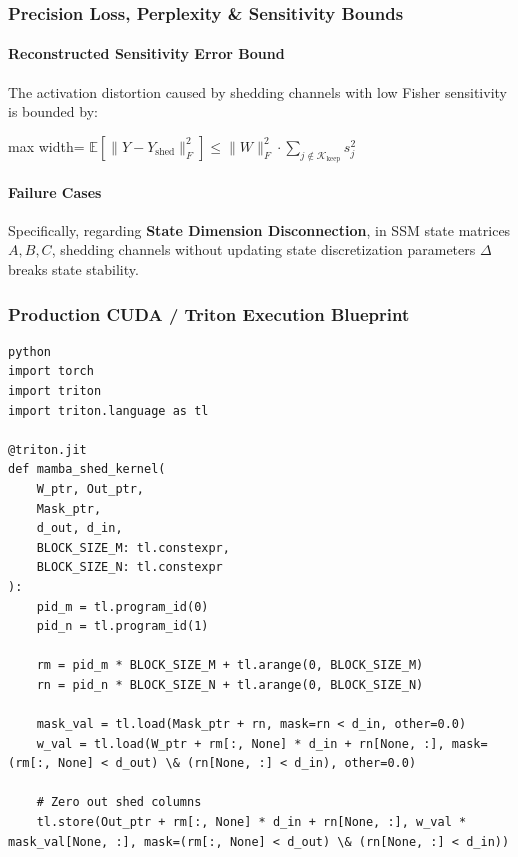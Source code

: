 \subsubsection*{Precision Loss, Perplexity \& Sensitivity Bounds}

\paragraph{Reconstructed Sensitivity Error Bound}

The activation distortion caused by shedding channels with low Fisher sensitivity is bounded by:

\begin{center}
\begin{adjustbox}{max width=\columnwidth}
$\displaystyle
\mathbb{E}\left[ \| Y - Y_{\text{shed}} \|_F^2 \right] \le \| W \|_F^2 \cdot \sum_{j \notin \mathcal{K}_{\text{keep}}} s_j^2
$
\end{adjustbox}
\end{center}

\paragraph{Failure Cases}

Specifically, regarding \textbf{State Dimension Disconnection}, in SSM state matrices $A, B, C$, shedding channels without updating state discretization parameters $\Delta$ breaks state stability.



\subsubsection*{Production CUDA / Triton Execution Blueprint}

\vspace{0.5em}
\begin{mdframed}[backgroundcolor=codebg, linecolor=codeframe, linewidth=1pt, roundcorner=4pt, innerleftmargin=2pt, innerrightmargin=5pt, innertopmargin=5pt, innerbottommargin=5pt]
\begin{lstlisting}
python
import torch
import triton
import triton.language as tl

@triton.jit
def mamba_shed_kernel(
    W_ptr, Out_ptr,
    Mask_ptr,
    d_out, d_in,
    BLOCK_SIZE_M: tl.constexpr,
    BLOCK_SIZE_N: tl.constexpr
):
    pid_m = tl.program_id(0)
    pid_n = tl.program_id(1)

    rm = pid_m * BLOCK_SIZE_M + tl.arange(0, BLOCK_SIZE_M)
    rn = pid_n * BLOCK_SIZE_N + tl.arange(0, BLOCK_SIZE_N)

    mask_val = tl.load(Mask_ptr + rn, mask=rn < d_in, other=0.0)
    w_val = tl.load(W_ptr + rm[:, None] * d_in + rn[None, :], mask=(rm[:, None] < d_out) \& (rn[None, :] < d_in), other=0.0)

    # Zero out shed columns
    tl.store(Out_ptr + rm[:, None] * d_in + rn[None, :], w_val * mask_val[None, :], mask=(rm[:, None] < d_out) \& (rn[None, :] < d_in))
\end{lstlisting}
\end{mdframed}
\vspace{0.5em}



